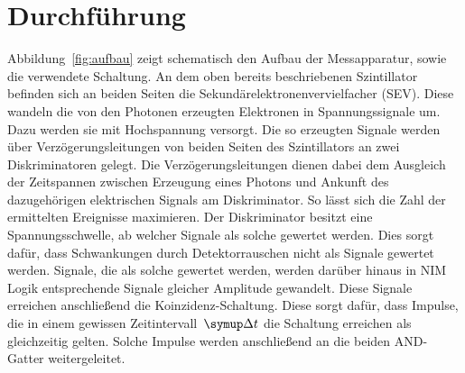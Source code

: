 \section{Durchführung}
\label{sec:durchführung}

Abbildung~\ref{fig:aufbau} zeigt schematisch den Aufbau der Messapparatur, sowie
die verwendete Schaltung. An dem oben bereits beschriebenen Szintillator
befinden sich an beiden Seiten die Sekundärelektronenvervielfacher (SEV). Diese
wandeln die von den Photonen erzeugten Elektronen in Spannungssignale um. Dazu
werden sie mit Hochspannung versorgt. Die so erzeugten Signale werden über
Verzögerungsleitungen von beiden Seiten des Szintillators an zwei
Diskriminatoren gelegt. Die Verzögerungsleitungen dienen dabei dem Ausgleich der
Zeitspannen zwischen Erzeugung eines Photons und Ankunft des dazugehörigen
elektrischen Signals am Diskriminator. So lässt sich die Zahl der ermittelten
Ereignisse maximieren. Der Diskriminator besitzt eine Spannungsschwelle, ab
welcher Signale als solche gewertet werden. Dies sorgt dafür, dass Schwankungen
durch Detektorrauschen nicht als Signale gewertet werden. Signale, die als
solche gewertet werden, werden darüber hinaus in NIM Logik entsprechende Signale
gleicher Amplitude gewandelt. Diese Signale erreichen anschließend die
Koinzidenz-Schaltung. Diese sorgt dafür, dass Impulse, die in einem gewissen
Zeitintervall~$\upD t$ die Schaltung erreichen als gleichzeitig gelten. Solche
Impulse werden anschließend an die beiden AND-Gatter weitergeleitet.

